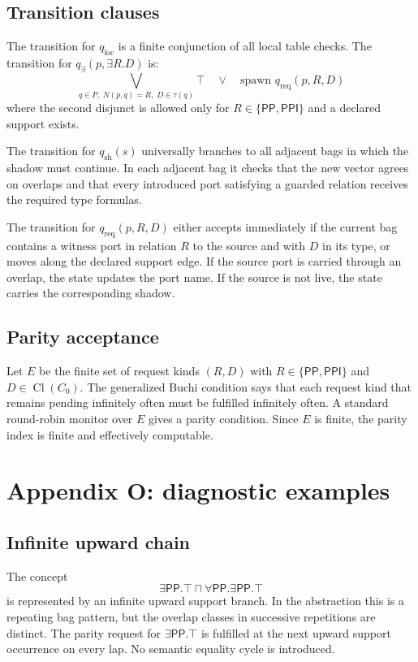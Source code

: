 \documentclass[11pt]{article}
\newcommand{\PP}{\mathsf{PP}}
\newcommand{\PPI}{\mathsf{PPI}}
\newcommand{\Cl}{\operatorname{Cl}}
\begin{document}
\subsection{Transition clauses}

The transition for $q_{\mathrm{loc}}$ is a finite conjunction of all local table checks.  The transition for $q_{\exists}(p,\exists R.D)$ is:
\[
\bigvee_{q\in P,\;N(p,q)=R,\;D\in\tau(q)} \top
\quad\vee\quad
\text{spawn }q_{\mathrm{req}}(p,R,D)
\]
where the second disjunct is allowed only for $R\in\{\PP,\PPI\}$ and a declared support exists.

The transition for $q_{\mathrm{sh}}(s)$ universally branches to all adjacent bags in which the shadow must continue.  In each adjacent bag it checks that the new vector agrees on overlaps and that every introduced port satisfying a guarded relation receives the required type formulas.

The transition for $q_{\mathrm{req}}(p,R,D)$ either accepts immediately if the current bag contains a witness port in relation $R$ to the source and with $D$ in its type, or moves along the declared support edge.  If the source port is carried through an overlap, the state updates the port name.  If the source is not live, the state carries the corresponding shadow.

\subsection{Parity acceptance}

Let $E$ be the finite set of request kinds $(R,D)$ with $R\in\{\PP,\PPI\}$ and $D\in\Cl(C_0)$.  The generalized Buchi condition says that each request kind that remains pending infinitely often must be fulfilled infinitely often.  A standard round-robin monitor over $E$ gives a parity condition.  Since $E$ is finite, the parity index is finite and effectively computable.

\section{Appendix O: diagnostic examples}

\subsection{Infinite upward chain}

The concept
\[
\exists\PP.\top\sqcap\forall\PP.\exists\PP.\top
\]
is represented by an infinite upward support branch.  In the abstraction this is a repeating bag pattern, but the overlap classes in successive repetitions are distinct.  The parity request for $\exists\PP.\top$ is fulfilled at the next upward support occurrence on every lap.  No semantic equality cycle is introduced.
\end{document}
